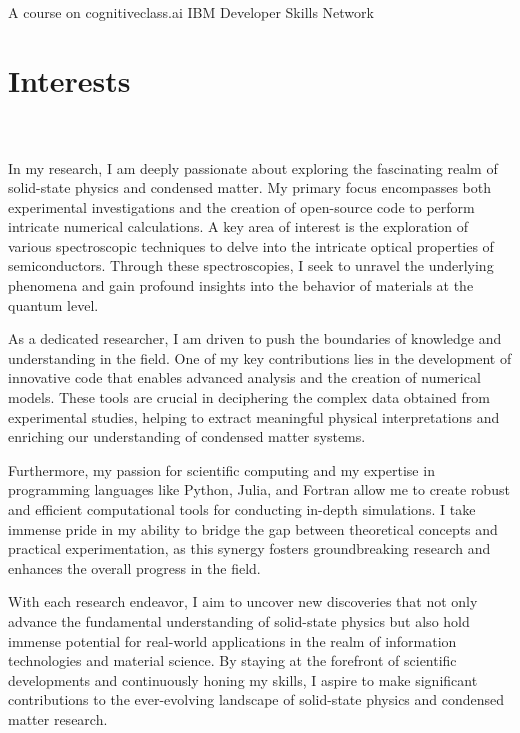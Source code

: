 \documentclass[letterpaper,dvipsnames]{twentysecondcv} %
\begin{document}
\newpage
\makeprofile 
\begin{twenty}
	{\\A course on cognitiveclass.ai}
	{IBM Developer Skills Network}
\end{twenty}

\section{Interests}
\\\\
In my research, I am deeply passionate about exploring the fascinating realm of solid-state physics and condensed matter. My primary focus encompasses both experimental investigations and the creation of open-source code to perform intricate numerical calculations. A key area of interest is the exploration of various spectroscopic techniques to delve into the intricate optical properties of semiconductors. Through these spectroscopies, I seek to unravel the underlying phenomena and gain profound insights into the behavior of materials at the quantum level.

As a dedicated researcher, I am driven to push the boundaries of knowledge and understanding in the field. One of my key contributions lies in the development of innovative code that enables advanced analysis and the creation of numerical models. These tools are crucial in deciphering the complex data obtained from experimental studies, helping to extract meaningful physical interpretations and enriching our understanding of condensed matter systems.

Furthermore, my passion for scientific computing and my expertise in programming languages like Python, Julia, and Fortran allow me to create robust and efficient computational tools for conducting in-depth simulations. I take immense pride in my ability to bridge the gap between theoretical concepts and practical experimentation, as this synergy fosters groundbreaking research and enhances the overall progress in the field.

With each research endeavor, I aim to uncover new discoveries that not only advance the fundamental understanding of solid-state physics but also hold immense potential for real-world applications in the realm of information technologies and material science. By staying at the forefront of scientific developments and continuously honing my skills, I aspire to make significant contributions to the ever-evolving landscape of solid-state physics and condensed matter research.
\end{document}
